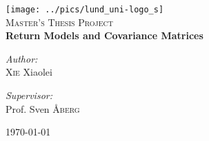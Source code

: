 \documentclass{report}
\author{Xie Xiaolei}
\date{\today}
\begin{document}
\begin{titlepage}
\begin{center}

\texttt{[image: ../pics/lund\_uni-logo\_s]}~\\[1cm]


\textsc{\Large Master's Thesis Project}\\[0.5cm]

{ \huge \bfseries Return Models and Covariance Matrices
  \\[0.4cm] }


\begin{minipage}{0.4\textwidth}
\begin{flushleft} \large
\emph{Author:}\\
\textsc{Xie} Xiaolei
\end{flushleft}
\end{minipage}
\begin{minipage}{0.4\textwidth}
\begin{flushright} \large
\emph{Supervisor:} \\
Prof. Sven \textsc{\AA berg}
\end{flushright}
\end{minipage}

\vfill

{\large \today}

\end{center}
\end{titlepage}
\end{document}

